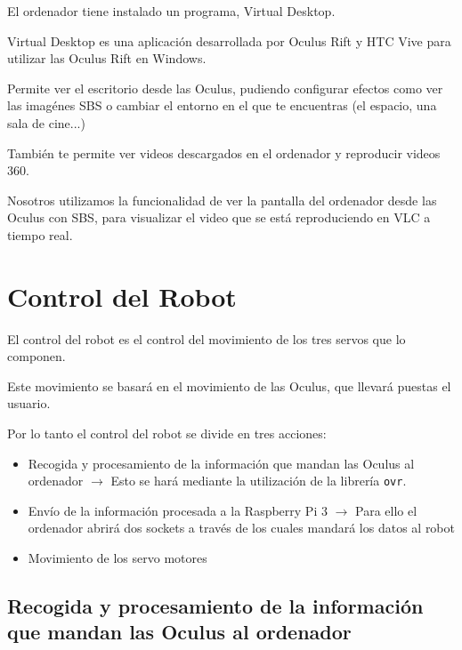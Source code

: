 \documentclass[twoside, 12pt]{epstfg}
\begin{document}
El ordenador tiene instalado un programa, Virtual Desktop.

Virtual Desktop es una aplicación desarrollada por Oculus Rift y  HTC Vive para utilizar las Oculus Rift en Windows.

Permite ver el escritorio desde las Oculus, pudiendo configurar efectos como ver las imagénes SBS o cambiar el entorno en el que te encuentras (el espacio, una sala de cine...)



También te permite ver videos descargados en el ordenador y reproducir videos 360.

Nosotros utilizamos la funcionalidad de ver la pantalla del ordenador desde las Oculus con SBS, para visualizar el video que se está reproduciendo en VLC a tiempo real.



\newpage

\section{Control del Robot}
El control del robot es el control del movimiento de los tres servos que lo componen. 

Este movimiento se basará en el movimiento de las Oculus, que llevará puestas el usuario.

Por lo tanto el control del robot se divide en tres acciones:
\begin{itemize}
	\item Recogida y procesamiento de la información que mandan las Oculus al ordenador $\rightarrow$ Esto se hará mediante la utilización de la librería \texttt{ovr}.
	
	\item Envío de la información procesada a la Raspberry Pi 3 $\rightarrow$ Para ello el ordenador abrirá dos sockets a través de los cuales mandará los datos al robot
	
	\item Movimiento de los servo motores
\end{itemize}
\subsection{Recogida y procesamiento de la información que mandan las Oculus al ordenador}
\end{document}
